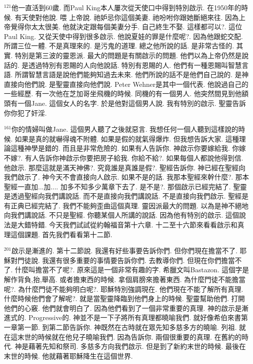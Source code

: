 \documentclass{book}
\begin{document}
$^{121}$他一直活到60歲.
而Paul King本人屢次從天使口中得到特別啟示.
在1950年的時候.
有天使對他說.
喂 上帝說.
祂妒忌你這個美妻.
祂吩咐你跟她斷絕來往.
因為上帝覺得你太太很美.
他就決定跟每個美妻分手.
自己終生不娶.
這樣都可以?.
這位Paul King.
又從天使中得到很多啟示.
他說夏娃的罪是什麼呢?.
因為他跟蛇交配.
所謂三位一體.
不是真理來的.
是污鬼的道理.
總之他所說的話.
是非常古怪的.
其實.
特別是第三波的靈恩派.
最大的問題是有關啟示的問題.
他們以為上帝仍然是說話的.
是透過特別有恩賜的人向他說話.
特別有恩賜的人.
他們有一種恩賜叫智慧言語.
所謂智慧言語是說他們能夠知過去未來.
他們所說的話不是他們自己說的.
是神直接向他們說.
是聖靈直接向他們說.
Peter Wehner是其中一個代表.
他說過自己的一些經歷.
有一次他在芝加哥坐飛機的時候.
同機的有一個男人.
他突然間見到他額頭有一個Jane.
這個女人的名字.
於是他對這個男人說.
我有特別的啟示.
聖靈告訴你你犯了奸淫.

$^{161}$你的情婦叫做Jane.
這個男人聽了之後就惡言.
我想任何一個人聽到這樣說的時候.
如果是真的就嚇得魂不附體.
如果是假的就氣得爆炸.
但我想告訴大家.
這種理論這種神學是錯的.
而且是非常危險的.
如果有人告訴你.
神啟示你要嫁給我.
你嫁不嫁?.
有人告訴你神啟示你要把房子給我.
你給不給?.
如果每個人都說他得到信.
他啟示.
那麼這就是滿天神佛?.
究竟誰是真誰是假?.
聖經告訴你.
神已經在聖經向我們啟示了.
神今天不會直接向人啟示.
如果不是的話.
我那本聖經來幹什麼?.
那本聖經一直加...加....
加多不知多少萬章下去了.
是不是?.
那個啟示已經完結了.
聖靈是透過聖經向我們講說話.
而不是直接向我們講說話.
不是直接向我們啟示.
聖經是有正典已經完結了.
我們不能夠歪曲這個真理.
靈因派最大的問題.
以為是神不絕地向我們講說話.
不只是聖經.
你聽某個人所講的說話.
因為他有特別的啟示.
這個說法是大錯特錯.
今天我們試試從約翰福音第十六章.
十二至十六節來看看啟示和真理這個課題.
首先我們看看第十二節.

$^{201}$啟示是漸進的.
第十二節說.
我還有好些事要告訴你們.
但你們現在擔當不了.
耶穌對門徒說.
我還有很多重要的事情要告訴你們.
去教導你們.
但現在你們擔當不了.
什麼叫擔當不了呢?.
原來這是一個非常有趣的字.
希臘文叫Bastazon.
這個字是解作背負,抬,舉高.
或者擔東西的時候.
拿個肩膀來擔著東西.
為什麼門徒不能擔當呢?.
為什麼門徒不能夠明白呢?.
耶穌特別強調現在.
他們現在不能了解所有真理.
什麼時候他們會了解呢?.
就是當聖靈降臨到他們身上的時候.
聖靈幫助他們.
打開他們的心竅.
他們就會明白了.
因為他們看到了一個非常重要的真理.
神的啟示是漸進式的.
Progressive的.
神並不是一下子將所有真理都曉喻我們.
就好像希伯來書第一章第一節.
到第二節告訴你.
神既然在古時就在眾先知多慈多方的曉喻.
列祖.
就在這末世的時候就在他兒子曉喻我們.
因為告訴你.
兩個很重要的真理.
在舊約的時代.
神是藉著先知和祭司.
多慈多方向我們啟示.
但是到了新約末世的時候.
最後在末世的時候.
他就藉著耶穌降生在這個世界.
\end{document}
